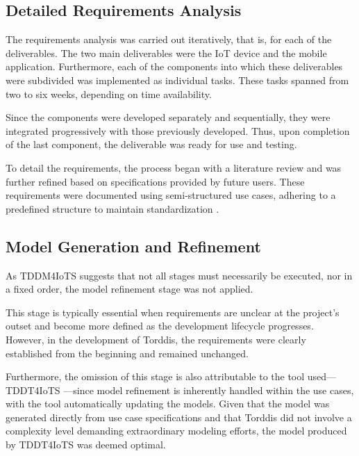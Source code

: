                 \subsection{Detailed Requirements Analysis}
                The requirements analysis was carried out iteratively, that is, for each of the deliverables. The two main deliverables were the IoT device and the mobile application. Furthermore, each of the components into which these deliverables were subdivided was implemented as individual tasks. These tasks spanned from two to six weeks, depending on time availability.
                
                Since the components were developed separately and sequentially, they were integrated progressively with those previously developed. Thus, upon completion of the last component, the deliverable was ready for use and testing.
                
                To detail the requirements, the process began with a literature review and was further refined based on specifications provided by future users. These requirements were documented using semi-structured use cases, adhering to a predefined structure to maintain standardization \citep{Zegzhda2018Use}.
                
                \subsection{Model Generation and Refinement}
                As TDDM4IoTS \citep{Guerrero-Ulloa2020TDDM4IoTS} suggests that not all stages must necessarily be executed, nor in a fixed order, the model refinement stage was not applied.
                
                This stage is typically essential when requirements are unclear at the project's outset and become more defined as the development lifecycle progresses. However, in the development of Torddis, the requirements were clearly established from the beginning and remained unchanged.
                
                Furthermore, the omission of this stage is also attributable to the tool used—TDDT4IoTS \citep{Guerrero2024Test}—since model refinement is inherently handled within the use cases, with the tool automatically updating the models. Given that the model was generated directly from use case specifications and that Torddis did not involve a complexity level demanding extraordinary modeling efforts, the model produced by TDDT4IoTS was deemed optimal.
                

